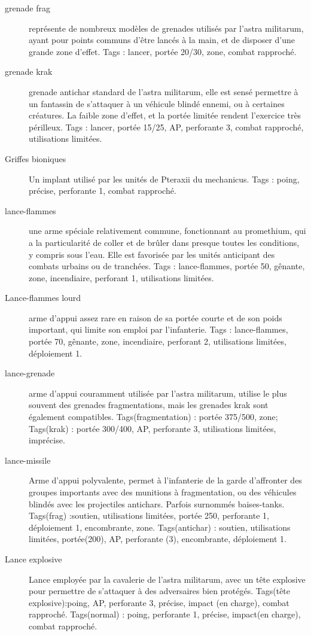 \documentclass[10pt,a4paper]{article}
\begin{document}
\begin{description}
\item[grenade frag]représente de nombreux modèles de grenades utilisés par l'astra militarum, ayant pour points communs d'être lancés à la main, et de disposer d'une grande zone d'effet. Tags : lancer, portée 20/30, zone, combat rapproché.
\item[grenade krak ]grenade antichar standard de l'astra militarum, elle est sensé permettre à un fantassin de s'attaquer à un véhicule blindé ennemi, ou à certaines créatures. La faible zone d'effet, et la portée limitée rendent l'exercice très périlleux. Tags : lancer, portée 15/25, AP, perforante 3, combat rapproché, utilisations limitées.
\item[Griffes bioniques]Un implant utilisé par les unités de Pteraxii du mechanicus. Tags : poing, précise, perforante 1, combat rapproché.
\item[lance-flammes]une arme spéciale relativement commune, fonctionnant au promethium, qui a la particularité de coller et de brûler dans presque toutes les conditions, y compris sous l'eau. Elle est favorisée par les unités anticipant des combats urbains ou de tranchées. Tags : lance-flammes, portée 50, gênante, zone, incendiaire, perforant 1, utilisations limitées.
\item[Lance-flammes lourd] arme d'appui assez rare en raison de sa portée courte et de son poids important, qui limite son emploi par l'infanterie. Tags : lance-flammes, portée 70, gênante, zone, incendiaire, perforant 2, utilisations limitées, déploiement 1.
\item[lance-grenade]arme d'appui couramment utilisée par l'astra militarum, utilise le plus souvent des grenades  fragmentations, mais les grenades krak sont également compatibles. Tags(fragmentation) : portée 375/500, zone; Tags(krak) : portée 300/400, AP, perforante 3, utilisations limitées, imprécise.
\item[lance-missile]Arme d'appui polyvalente, permet à l'infanterie de la garde d'affronter des groupes importants avec des munitions à fragmentation, ou des véhicules blindés avec les projectiles antichars. Parfois surnommés baises-tanks. Tags(frag) :soutien, utilisations limitées, portée 250, perforante 1, déploiement 1, encombrante, zone. Tags(antichar) : soutien, utilisations limitées, portée(200), AP, perforante (3), encombrante, déploiement 1.
\item[Lance explosive]Lance employée par la cavalerie de l'astra militarum, avec un tête explosive pour permettre de s'attaquer à des adversaires bien protégés. Tags(tête explosive):poing, AP, perforante 3, précise, impact (en charge), combat rapproché. Tags(normal) : poing, perforante 1, précise, impact(en charge), combat rapproché.

\end{description}
\end{document}
